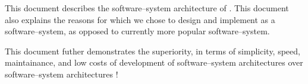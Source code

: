 \begin{center}
\parbox{42em}{
This document describes the \thickclient
software--system architecture of \yerotherpblack.
This document also explains the reasons for
which we chose to design and implement
\yerotherpblack as a \thickclient software--system,
as opposed to currently more popular
\webbrowserbased software--system.
\newline

\textcolor{purplish}{
This document futher demonstrates the superiority,
in terms of simplicity, speed, maintainance, and
low costs of development of \thickclient
software--system architectures over \webbrowserbased
software--system architectures !}
}
\end{center}
